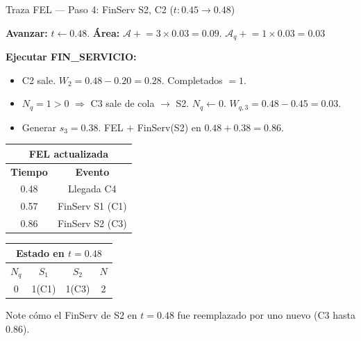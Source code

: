 \documentclass[aspectratio=1610, 9pt]{beamer}
\begin{document}
\begin{frame}{Traza FEL --- Paso 4: FinServ S2, C2 ($t: 0.45 \to 0.48$)}

\textbf{Avanzar:} $t \leftarrow 0.48$. \quad \textbf{Área:} $\mathcal{A} \mathrel{+}= 3 \times 0.03 = 0.09$. \; $\mathcal{A}_q \mathrel{+}= 1 \times 0.03 = 0.03$

\textbf{Ejecutar FIN\_SERVICIO:}
\begin{itemize}
    \item C2 sale. $W_2 = 0.48 - 0.20 = 0.28$. Completados $= 1$.
    \item $N_q = 1 > 0$ $\Rightarrow$ C3 sale de cola $\to$ S2. $N_q \leftarrow 0$. $W_{q,3} = 0.48 - 0.45 = 0.03$.
    \item Generar $s_3 = 0.38$. \textcolor{verdeoscuro}{FEL $+$} FinServ(S2) en $0.48 + 0.38 = 0.86$.
\end{itemize}

\vspace{0.15cm}
\begin{center}
\renewcommand{\arraystretch}{1.3}
\begin{tabular}{|c|c|}
\hline
\multicolumn{2}{|c|}{\cellcolor{azuloscuro!15}\textbf{FEL actualizada}} \\
\hline
\textbf{Tiempo} & \textbf{Evento} \\
\hline
\rowcolor{yellow!20} 0.48 & Llegada C4 \\
0.57 & FinServ S1 (C1) \\
0.86 & FinServ S2 (C3) \\
\hline
\end{tabular}
\hspace{1.5cm}
\begin{tabular}{|c|c|c|c|}
\hline
\multicolumn{4}{|c|}{\cellcolor{grisclaro}\textbf{Estado en $t=0.48$}} \\
\hline
$N_q$ & $S_1$ & $S_2$ & $N$ \\
\hline
0 & 1(C1) & 1(C3) & 2 \\
\hline
\end{tabular}
\end{center}

\small Note cómo el FinServ de S2 en $t=0.48$ fue reemplazado por uno nuevo (C3 hasta 0.86).
\end{frame}
\end{document}
